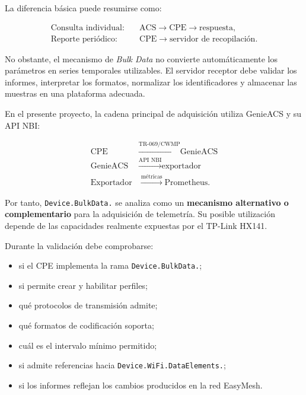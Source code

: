 La diferencia básica puede resumirse como:

\[
\begin{aligned}
    \text{Consulta individual:}\quad&
    \text{ACS}
    \longrightarrow
    \text{CPE}
    \longrightarrow
    \text{respuesta},\\[0.2cm]
    \text{Reporte periódico:}\quad&
    \text{CPE}
    \longrightarrow
    \text{servidor de recopilación}.
\end{aligned}
\]

No obstante, el mecanismo de \textit{Bulk Data} no convierte
automáticamente los parámetros en series temporales utilizables. El
servidor receptor debe validar los informes, interpretar los formatos,
normalizar los identificadores y almacenar las muestras en una
plataforma adecuada.

En el presente proyecto, la cadena principal de adquisición utiliza
GenieACS y su API NBI:

\[
\begin{aligned}
    \text{CPE}
    &\xrightarrow{\text{TR-069/CWMP}}
    \text{GenieACS}\\
    \text{GenieACS}
    &\xrightarrow{\text{API NBI}}
    \text{exportador}\\
    \text{Exportador}
    &\xrightarrow{\text{métricas}}
    \text{Prometheus}.
\end{aligned}
\]

Por tanto, \texttt{Device.BulkData.} se analiza como un
\textbf{mecanismo alternativo o complementario} para la adquisición de
telemetría. Su posible utilización depende de las capacidades realmente
expuestas por el TP-Link HX141.

Durante la validación debe comprobarse:

\begin{itemize}
    \item si el CPE implementa la rama
    \texttt{Device.BulkData.};

    \item si permite crear y habilitar perfiles;

    \item qué protocolos de transmisión admite;

    \item qué formatos de codificación soporta;

    \item cuál es el intervalo mínimo permitido;

    \item si admite referencias hacia
    \texttt{Device.WiFi.DataElements.};

    \item si los informes reflejan los cambios producidos en la red
    EasyMesh.
\end{itemize}

